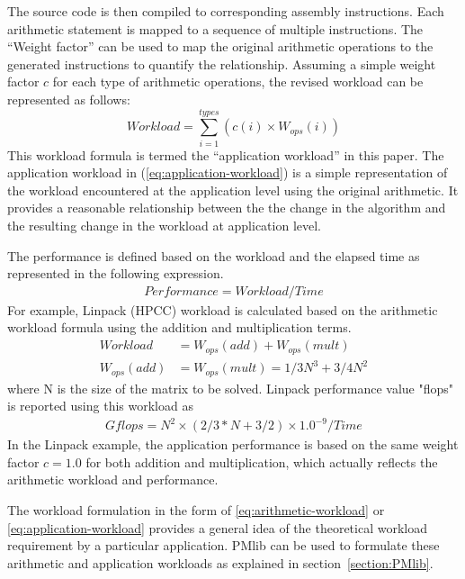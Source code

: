 \documentclass[conference]{IEEEtran}
\begin{document}
The source code is then compiled to corresponding assembly instructions.
Each arithmetic statement is mapped to a sequence of multiple instructions.
The ``Weight factor'' can be used to map the original arithmetic operations
to the generated instructions to quantify the relationship.
Assuming a simple weight factor $ c $ for each type of
arithmetic operations, 
the revised workload can be represented as follows:
\begin{equation}\label{eq:application-workload}
		Workload = \sum_{i=1}^{types} \left(c(i)\times W_{ops}(i)\right)
\end{equation}
%
This workload formula is termed the ``application workload'' in this paper.
The application workload in (\ref{eq:application-workload}) is a simple
representation of the workload encountered at the application level 
using the original arithmetic.
It provides a reasonable relationship between the
the change in the algorithm and the resulting change in the workload at
application level.

The performance is defined based on the workload and the elapsed time
as represented in the following expression.
\begin{align}\label{eq:performance-workload-time}
Performance = Workload / Time 
\end{align}
%
For example, Linpack (HPCC)%
workload is calculated based on the arithmetic workload formula
using the addition and multiplication terms.
\begin{align}
		Workload & = W_{ops}(add) + W_{ops}(mult) \\
		W_{ops}(add) & = W_{ops}(mult) = 1/3 N^{3} + 3/4 N^{2}
\end{align}
where N is the size of the matrix to be solved.
Linpack performance value "flops" is reported using this workload as
\begin{align*}
Gflops = N^{2} \times ( 2/3 * N + 3/2 ) \times 1.0^{-9} / Time 
\end{align*}
In the Linpack example, the application performance is based on
the same weight factor $ c = 1.0 $ 
for both addition and multiplication, which actually reflects the
arithmetic workload and performance.

The workload formulation in the form of
\eqref{eq:arithmetic-workload}
or
\eqref{eq:application-workload}
provides a general idea of the theoretical workload requirement by
a particular application.
PMlib can be used to formulate these arithmetic and application workloads
as explained in section~\ref{section:PMlib}.
\end{document}
